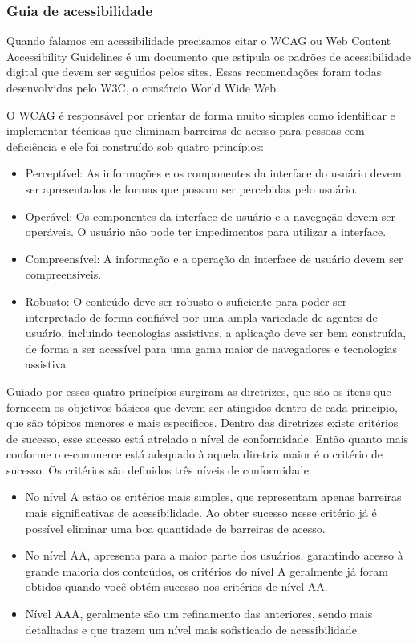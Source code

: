 \subsubsection{Guia de acessibilidade}
{Quando falamos em acessibilidade precisamos citar o WCAG ou Web Content Accessibility Guidelines é um documento que estipula os padrões de acessibilidade digital que devem ser seguidos pelos sites. Essas recomendações foram todas desenvolvidas pelo W3C, o consórcio World Wide Web.

O WCAG é responsável por orientar de forma muito simples como identificar e implementar técnicas que eliminam barreiras de acesso para pessoas com deficiência e ele foi construído sob quatro princípios:
\begin{itemize}
\item Perceptível: As informações e os componentes da interface do usuário devem ser apresentados de formas que possam ser percebidas pelo usuário.
\item Operável: Os componentes da interface de usuário e a navegação devem ser operáveis. O usuário não pode ter impedimentos para utilizar a interface.
\item Compreensível: A informação e a operação da interface de usuário devem ser compreensíveis. 
\item Robusto: O conteúdo deve ser robusto o suficiente para poder ser interpretado de forma confiável por uma ampla variedade de agentes de usuário, incluindo tecnologias assistivas. a aplicação deve ser bem construída, de forma a ser acessível para uma gama maior de navegadores e tecnologias assistiva
\end{itemize}

Guiado por esses quatro princípios surgiram as diretrizes, que são os itens que fornecem os objetivos básicos que devem ser atingidos dentro de cada principio, que são tópicos menores e mais específicos. Dentro das diretrizes existe critérios de sucesso, esse sucesso está atrelado a nível de conformidade. Então quanto mais conforme o e-commerce está adequado à aquela diretriz maior é o critério de sucesso. Os critérios são definidos três níveis de conformidade:
\begin{itemize}
\item No nível A estão os critérios mais simples, que representam apenas barreiras mais significativas de acessibilidade. Ao obter sucesso nesse critério já é possível eliminar uma boa quantidade de barreiras de acesso. 
\item No nível AA,  apresenta para a maior parte dos usuários, garantindo acesso à grande maioria dos conteúdos, os critérios do nível A geralmente já foram obtidos quando você obtém sucesso nos critérios de nível AA.
\item Nível AAA, geralmente são um refinamento das anteriores, sendo mais detalhadas e que trazem um nível mais sofisticado de acessibilidade.
\end{itemize}

}
